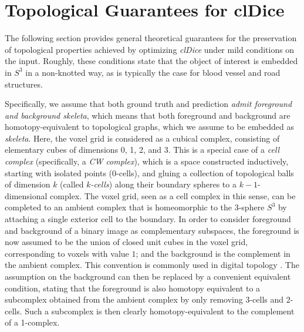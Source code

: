 \section{Topological Guarantees for clDice}
\label{sec:proof}

The following section provides general theoretical guarantees for the preservation of topological properties achieved by optimizing \textit{clDice} under mild conditions on the input.
Roughly, these conditions state that the object of interest is embedded in $S^3$ in a non-knotted way, as is typically the case for blood vessel and road structures.


Specifically, we assume that both ground truth and prediction \emph{admit foreground and background skeleta}, which means that both foreground and background are homotopy-equivalent to topological graphs, which we assume to be embedded as \emph{skeleta}.
Here, the voxel grid is considered as a cubical complex, consisting of elementary cubes of dimensions 0, 1, 2, and 3.
This is a special case of a \emph{cell complex} (specifically, a \emph{CW complex}), which is a space constructed inductively, starting with isolated points ($0$-cells), and gluing a collection of topological balls of dimension $k$ (called \emph{$k$-cells}) along their boundary spheres to a $k-1$-dimensional complex.
The voxel grid, seen as a cell complex in this sense,
can be completed to an ambient complex that is homeomorphic to the 3-sphere $S^3$ by attaching a single exterior cell to the boundary.
In order to consider foreground and background of a binary image as complementary subspaces,
the foreground is now assumed to be the union of closed unit cubes in the voxel grid, corresponding to voxels with value $1$; and the background is the complement in the ambient complex.
This convention is commonly used in digital topology \cite{kong1989digital,kong1995topology}.
The assumption on the background can then be replaced by a convenient equivalent condition, stating that the foreground is also homotopy equivalent to a subcomplex obtained from the ambient complex by only removing 3-cells and 2-cells.
Such a subcomplex is then clearly homotopy-equivalent to the complement of a 1-complex.\\



